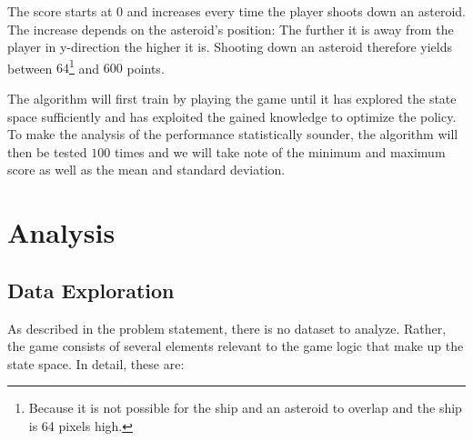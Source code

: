 \documentclass[a4paper,10pt]{article}
\begin{document}
The score starts at $0$ and increases every time the player shoots down an asteroid.
The increase depends on the asteroid's position: The further it is away from the player in y-direction the higher it is.
Shooting down an asteroid therefore yields between $64$\footnote{Because it is not possible for the ship and an asteroid to overlap and the ship is 64 pixels high.} and $600$ points.

The algorithm will first train by playing the game until it has explored the state space sufficiently and has exploited the gained knowledge to optimize the policy.
To make the analysis of the performance statistically sounder, the algorithm will then be tested $100$ times and we will take note of the minimum and maximum score as well as the mean and standard deviation.
\section{Analysis}

\subsection{Data Exploration}
\label{dataexploration}

As described in the problem statement, there is no dataset to analyze.
Rather, the game consists of several elements relevant to the game logic that make up the state space.
In detail, these are:
\end{document}
